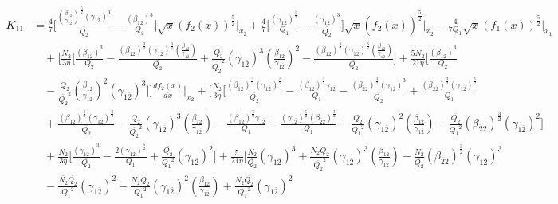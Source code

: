 \documentclass[fleqn, 10pt]{article}
\begin{document}
      \begin{equation}
    \begin{split}
         K_{11} & = \frac{4}{7} \biggl[ \frac{\left( \frac{\beta_{12}}{\gamma_{1\overline{2}}}\right)^\frac{5}{2} (\gamma_{1\overline{2}})^3}{\overline{Q_{2}}} -   \frac{(\beta_{12})^3}{Q_2} \biggr] \sqrt{x} (f_2(x))^\frac{5}{2} \Bigg|_{x_2} +   \frac{4}{7} \biggl[\frac{(\gamma_{1\overline{2}})^\frac{5}{2}}{Q_1} - \frac{(\gamma_{1\overline{2}})^3}{\overline{Q_{2}}} \biggr] \sqrt{x} (\overline{f_{2}(x)})^\frac{5}{2} \Bigg|_{\overline{x_{2}}} -  \frac{4}{7 Q_1} \sqrt{x} (f_1(x))^\frac{5}{2} \Bigg|_{x_1} \\ & \quad + \Biggl[ \frac{N_2}{3 \eta} \Biggl[ \frac{(\beta_{12})^3}{Q_2}  - \frac{(\beta_{12})^\frac{3}{2} (\gamma_{1\overline{2}})^\frac{3}{2} \left( \frac{\beta_{12}}{\gamma_{1\overline{2}}}\right)}{\overline{Q_{2}}} + \frac{Q_2}{{\overline{Q_{2}}}^2} (\gamma_{1\overline{2}})^3 \left( \frac{\beta_{12}}{\gamma_{1\overline{2}}}\right)^2 - \frac{(\beta_{12})^\frac{3}{2} (\gamma_{1\overline{2}})^\frac{3}{2} \left( \frac{\beta_{12}}{\gamma_{1\overline{2}}}\right)}{\overline{Q_{2}}} \Biggr] + \frac{5 N_2}{21 \eta} \Biggl[ \frac{(\beta_{12})^3}{Q_2} \\ & \quad -   \frac{Q_2}{{\overline{Q_{2}}}^2} \left( \frac{\beta_{12}}{\gamma_{1\overline{2}}}\right)^2 (\gamma_{1\overline{2}})^3 \Biggr] \Biggr] \frac{df_2(x)}{dx} \Bigg|_{x_2}  + \Biggl[ \frac{N_2}{3 \eta} \Biggl[ \frac{(\beta_{12})^\frac{3}{2} (\gamma_{1\overline{2}})^\frac{3}{2}}{\overline{Q_{2}}} - \frac{(\beta_{12})^\frac{3}{2} \gamma_{1\overline{2}}}{Q_1} - \frac{(\beta_{\overline{2}2})^\frac{3}{2}(\gamma_{1\overline{2}})^3}{\overline{Q_{2}}} + \frac{(\beta_{\overline{2}2})^\frac{3}{2} (\gamma_{1\overline{2}})^\frac{5}{2}}{Q_1} \\ & \quad + \frac{(\beta_{12})^\frac{3}{2} (\gamma_{1\overline{2}})^\frac{3}{2}}{\overline{Q_{2}}} - \frac{Q_2}{{\overline{Q_{2}}}^2} (\gamma_{1\overline{2}})^3 \left( \frac{\beta_{12}}{\gamma_{1\overline{2}}}\right) - \frac{(\beta_{12})^\frac{3}{2} \gamma_{1\overline{2}}}{Q_1}  + \frac{(\gamma_{1\overline{2}})^\frac{5}{2} (\beta_{\overline{2}2})^\frac{3}{2}}{Q_1} + \frac{Q_2}{{Q_1}^2} (\gamma_{1\overline{2}})^2 \left( \frac{\beta_{12}}{\gamma_{1\overline{2}}}\right) - \frac{\overline{Q_{2}}}{{Q_1}^2} (\beta_{\overline{2}2})^\frac{3}{2} (\gamma_{1\overline{2}})^2 \Biggr] \\ & \quad + \frac{\overline{N_{2}}}{3 \eta} \Biggl[ \frac{(\gamma_{1\overline{2}})^3}{\overline{Q_{2}}} - \frac{2(\gamma_{1\overline{2}})^\frac{5}{2}}{Q_1} + \frac{\overline{Q_{2}}}{{Q_1}^2} (\gamma_{1\overline{2}})^2 \Biggr]  + \frac{5}{21 \eta} \Biggl[ \frac{\overline{N_{2}}}{\overline{Q_{2}}} (\gamma_{1\overline{2}})^3 + \frac{N_2 Q_2}{{\overline{Q_{2}}}^2}(\gamma_{1\overline{2}})^3 \left( \frac{\beta_{12}}{\gamma_{1\overline{2}}}\right) - \frac{N_2}{\overline{Q_{2}}} (\beta_{\overline{2}2})^\frac{3}{2} (\gamma_{1\overline{2}})^3 \\ & \quad - \frac{\overline{N_{2}} \overline{Q_{2}}}{{Q_1}^2} (\gamma_{1\overline{2}})^2 - \frac{N_2 Q_2}{{Q_1}^2} (\gamma_{1\overline{2}})^2 \left( \frac{\beta_{12}}{\gamma_{1\overline{2}}}\right)  +   \frac{N_2 \overline{Q_{2}}}{{Q_1}^2} (\gamma_{1\overline{2}})^2 
\end{split}
\end{equation}
\end{document}
